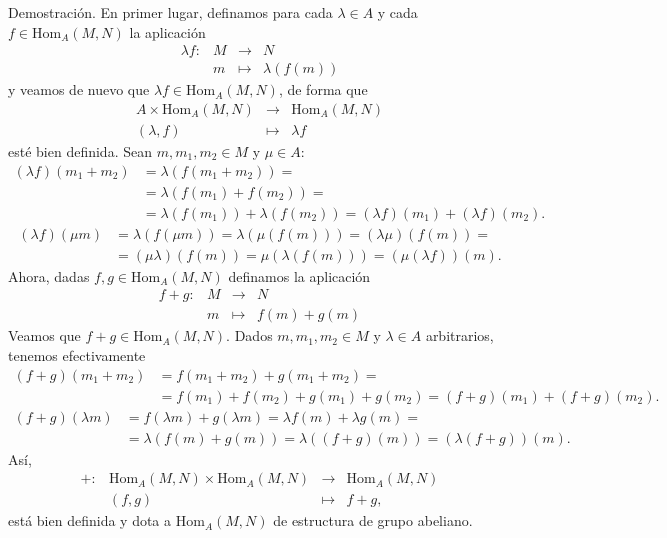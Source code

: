 \documentclass[a4paper,12pt]{article}
\newcommand{\Hom}{\text{Hom}}
\theoremstyle{definition}
\begin{document}
Demostración. En primer lugar, definamos para cada $\lambda\in A$ y cada $f\in\Hom_A(M,N)$ la aplicación
$$\begin{array}{rccl}
    \lambda f:&M&\longrightarrow&N\\
    &m&\longmapsto&\lambda(f(m))
\end{array}$$
y veamos de nuevo que $\lambda f\in\Hom_A(M,N)$, de forma que
$$\begin{array}{rcl}
    A\times\Hom_A(M,N)&\longrightarrow&\Hom_A(M,N)\\
    (\lambda,f)&\longmapsto&\lambda f
\end{array}$$
esté bien definida. Sean $m,m_1,m_2\in M$ y $\mu\in A$:
\begin{align*}
    (\lambda f)(m_1+m_2)&=\lambda(f(m_1+m_2))=\\
    &=\lambda(f(m_1)+f(m_2))=\\
    &=\lambda(f(m_1))+\lambda(f(m_2))=(\lambda f)(m_1)+(\lambda f)(m_2).
\end{align*}
\begin{align*}
    (\lambda f)(\mu m)&=\lambda(f(\mu m))=\lambda(\mu(f(m)))=(\lambda\mu)(f(m))=\\
    &=(\mu\lambda)(f(m))=\mu(\lambda(f(m)))=(\mu(\lambda f))(m).
\end{align*}
Ahora, dadas $f,g\in\Hom_A(M,N)$ definamos la aplicación
$$\begin{array}{rccl}
    f+g:&M&\longrightarrow&N\\
    &m&\longmapsto&f(m)+g(m)
\end{array}$$
Veamos que $f+g\in\Hom_A(M,N)$. Dados $m,m_1,m_2\in M$ y $\lambda\in A$ arbitrarios, tenemos efectivamente
\begin{align*}
    (f+g)(m_1+m_2)&=f(m_1+m_2)+g(m_1+m_2)=\\
    &=f(m_1)+f(m_2)+g(m_1)+g(m_2)=(f+g)(m_1)+(f+g)(m_2).
\end{align*}
\begin{align*}
    (f+g)(\lambda m)&=f(\lambda m)+g(\lambda m)=\lambda f(m)+\lambda g(m)=\\
    &=\lambda(f(m)+g(m))=\lambda((f+g)(m))=(\lambda(f+g))(m).
\end{align*}
Así,
$$\begin{array}{rrcl}
    +:&\Hom_A(M,N)\times\Hom_A(M,N)&\longrightarrow&\Hom_A(M,N)\\
    &(f,g)&\longmapsto&f+g,
\end{array}$$
está bien definida y dota a $\Hom_A(M,N)$ de estructura de grupo abeliano.
\end{document}
